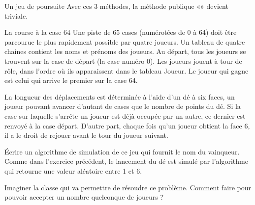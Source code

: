 \begin{Exercice}{Un jeu de poursuite}
	Avec ces 3 méthodes, la méthode publique
	«» devient triviale.
\end{Exercice}

\begin{Exercice}{La course à la case 64}
	Une piste de 65 cases (numérotées de 0 à 64)
	doit être parcourue le plus rapidement possible par quatre joueurs. Un
	tableau  de quatre chaines contient les noms et prénoms des
	joueurs. Au départ, tous les joueurs se trouvent sur la case de départ
	(la case numéro 0). Les joueurs jouent à tour de rôle, dans l’ordre où
	ils apparaissent dans le tableau Joueur. Le joueur qui gagne est celui
	qui arrive le premier sur la case 64.

	La longueur des déplacements est déterminée à
	l’aide d’un dé à six faces, un joueur pouvant avancer d’autant de cases
	que le nombre de points du dé. Si la case sur laquelle s’arrête un joueur 
	est déjà 	occupée par un autre, ce dernier est renvoyé à la case départ. 
	D’autre 	part, chaque fois qu’un joueur obtient la face 6, il a le droit de
	rejouer avant le tour du joueur suivant. 

	Écrire un algorithme de simulation de ce jeu
	qui fournit le nom du vainqueur. Comme dans l’exercice précédent, le
	lancement du dé est simulé par l'algorithme  qui retourne une valeur aléatoire entre 1 et 6.

	Imaginer la classe  qui va permettre
	de résoudre ce problème. Comment faire pour pouvoir accepter un nombre
	quelconque de joueurs ?
\end{Exercice}

